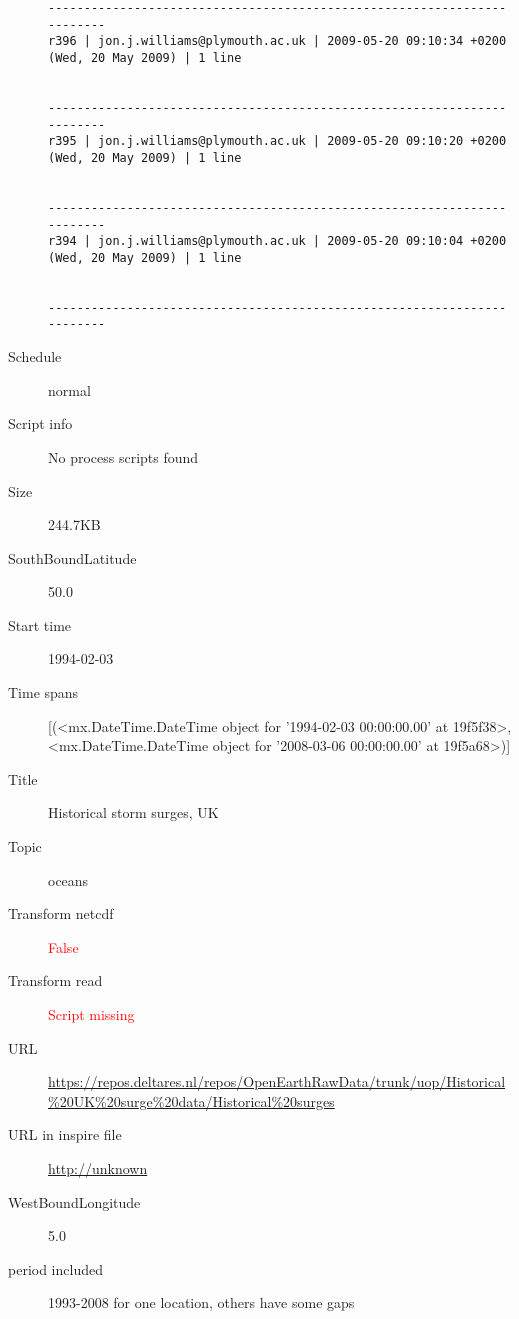 \documentclass[9]{report}
\begin{document}
\begin{description}
\begin{verbatim}
------------------------------------------------------------------------
r396 | jon.j.williams@plymouth.ac.uk | 2009-05-20 09:10:34 +0200 (Wed, 20 May 2009) | 1 line


------------------------------------------------------------------------
r395 | jon.j.williams@plymouth.ac.uk | 2009-05-20 09:10:20 +0200 (Wed, 20 May 2009) | 1 line


------------------------------------------------------------------------
r394 | jon.j.williams@plymouth.ac.uk | 2009-05-20 09:10:04 +0200 (Wed, 20 May 2009) | 1 line


------------------------------------------------------------------------

\end{verbatim}
  \item[Schedule] normal
  \item[Script info] No process scripts found
  \item[Size] 244.7KB
  \item[SouthBoundLatitude] 50.0
  \item[Start time] 1994-02-03
  \item[Time spans] [(<mx.DateTime.DateTime object for '1994-02-03 00:00:00.00' at 19f5f38>, <mx.DateTime.DateTime object for '2008-03-06 00:00:00.00' at 19f5a68>)]
  \item[Title]  Historical storm surges, UK 
  \item[Topic] oceans
  \item[Transform netcdf] \textcolor{red}{False}
  \item[Transform read] \textcolor{red}{Script missing}
  \item[URL] \href{https://repos.deltares.nl/repos/OpenEarthRawData/trunk/uop/Historical\%20UK\%20surge\%20data/Historical\%20surges}{https://repos.deltares.nl/repos/OpenEarthRawData/trunk/uop/Historical\%20UK\%20surge\%20data/Historical\%20surges}
  \item[URL in inspire file] \href{http://unknown}{http://unknown}
  \item[WestBoundLongitude] 5.0
  \item[period included] 1993-2008 for one location, others have some gaps
\end{description}
\end{document}
